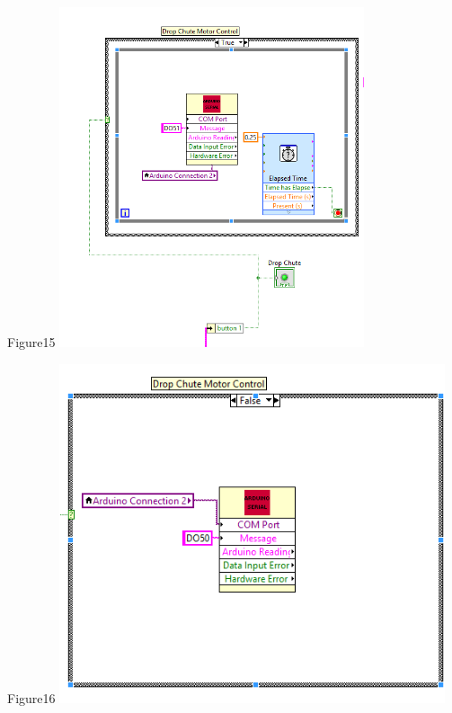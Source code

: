 \documentclass{article}
\begin{document}
\begin{center}{Figure15 \includegraphics[height=10cm]{DropChute1.png}}\end{center}
\begin{center}{Figure16 \includegraphics[height=10cm]{DropChute2.png}}\end{center}
\end{document}
